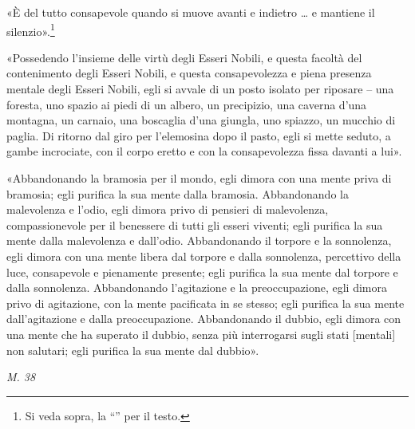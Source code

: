 «È del tutto consapevole quando si muove avanti e indietro … e mantiene
il silenzio».\footnote{Si veda sopra, la “\hyperlink{pag267}{}” per il testo.}


«Possedendo l’insieme delle virtù degli Esseri Nobili, e questa facoltà
del contenimento degli Esseri Nobili, e questa consapevolezza e piena
presenza mentale degli Esseri Nobili, egli si avvale di un posto isolato
per riposare – una foresta, uno spazio ai piedi di un albero, un
precipizio, una caverna d’una montagna, un carnaio, una boscaglia d’una
giungla, uno spiazzo, un mucchio di paglia. Di ritorno dal giro per
l’elemosina dopo il pasto, egli si mette seduto, a gambe incrociate, con
il corpo eretto e con la consapevolezza fissa davanti a lui».


«Abbandonando la bramosia per il mondo, egli dimora con una mente priva
di bramosia; egli purifica la sua mente dalla bramosia. Abbandonando la
malevolenza e l’odio, egli dimora privo di pensieri di malevolenza,
compassionevole per il benessere di tutti gli esseri viventi; egli
purifica la sua mente dalla malevolenza e dall’odio. Abbandonando il
torpore e la sonnolenza, egli dimora con una mente libera dal torpore e
dalla sonnolenza, percettivo della luce, consapevole e pienamente
presente; egli purifica la sua mente dal torpore e dalla sonnolenza.
Abbandonando l’agitazione e la preoccupazione, egli dimora privo di
agitazione, con la mente pacificata in se stesso; egli purifica la sua
mente dall’agitazione e dalla preoccupazione. Abbandonando il dubbio,
egli dimora con una mente che ha superato il dubbio, senza più
interrogarsi sugli stati [mentali] non salutari; egli purifica la sua
mente dal dubbio».


\emph{M. 38}


